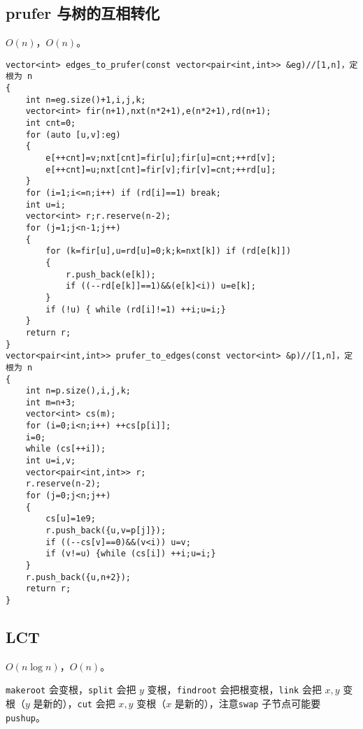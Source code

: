 \documentclass[12pt]{ctexart}
\begin{document}
\subsection{prufer 与树的互相转化}

$O(n)$，$O(n)$。

\begin{lstlisting}
vector<int> edges_to_prufer(const vector<pair<int,int>> &eg)//[1,n]，定根为 n
{
	int n=eg.size()+1,i,j,k;
	vector<int> fir(n+1),nxt(n*2+1),e(n*2+1),rd(n+1);
	int cnt=0;
	for (auto [u,v]:eg)
	{
		e[++cnt]=v;nxt[cnt]=fir[u];fir[u]=cnt;++rd[v];
		e[++cnt]=u;nxt[cnt]=fir[v];fir[v]=cnt;++rd[u];
	}
	for (i=1;i<=n;i++) if (rd[i]==1) break;
	int u=i;
	vector<int> r;r.reserve(n-2);
	for (j=1;j<n-1;j++)
	{	
		for (k=fir[u],u=rd[u]=0;k;k=nxt[k]) if (rd[e[k]]) 
		{
			r.push_back(e[k]);
			if ((--rd[e[k]]==1)&&(e[k]<i)) u=e[k];
		}
		if (!u) { while (rd[i]!=1) ++i;u=i;}
	}
	return r;
}
vector<pair<int,int>> prufer_to_edges(const vector<int> &p)//[1,n]，定根为 n
{
	int n=p.size(),i,j,k;
	int m=n+3;
	vector<int> cs(m);
	for (i=0;i<n;i++) ++cs[p[i]];
	i=0;
	while (cs[++i]);
	int u=i,v;
	vector<pair<int,int>> r;
	r.reserve(n-2);
	for (j=0;j<n;j++)
	{
		cs[u]=1e9;
		r.push_back({u,v=p[j]});
		if ((--cs[v]==0)&&(v<i)) u=v;
		if (v!=u) {while (cs[i]) ++i;u=i;}
	}
	r.push_back({u,n+2});
	return r;
}

\end{lstlisting}



\subsection{LCT}

$O(n\log n)$，$O(n)$。

\verb|makeroot| 会变根，\verb|split| 会把 $y$ 变根，\verb|findroot| 会把根变根，\verb|link| 会把 $x,y$ 变根（$y$ 是新的），\verb|cut| 会把 $x,y$ 变根（$x$ 是新的），注意\verb|swap| 子节点可能要 \verb|pushup|。
\end{document}
